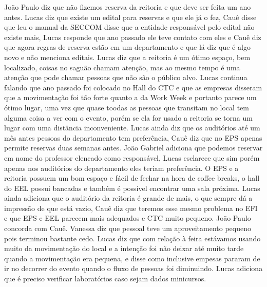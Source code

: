 \documentclass{ata-calico}
\begin{document}
 João Paulo diz que não fizemos reserva da
reitoria e que deve ser feita um ano antes. Lucas diz que existe um edital para
reservas e que ele já o fez, Cauê disse que leu o manual da SECCOM disse que a
entidade responsável pelo edital não existe mais, Lucas responde que ano
passado ele teve contato com eles e Cauê diz que agora regras de reserva estão
em um departamento e que lá diz que é algo novo e não menciona editais. Lucas
diz que a reitoria é um ótimo espaço, bem localizado, coisas no saguão chamam
atenção, mas ao mesmo tempo é uma atenção que pode chamar pessoas que não são o
público alvo. Lucas continua falando que ano passado foi colocado no Hall do
CTC e que as empresas disseram que a movimentação foi tão forte quanto a da
Work Week e portanto parece um ótimo lugar, uma vez que quase toodas as pessoas
que transitam no local tem alguma coisa a ver com o evento, porém se ela for
usado a reitoria se torna um lugar com uma distância inconveniente. Lucas ainda
diz que os auditórios até um mês antes pessoas do departamento tem preferência,
Cauê diz que no EPS apenas permite reservas duas semanas antes. João Gabriel
adiciona que podemos reservar em nome do professor elencado como responsável,
Lucas esclarece que sim porém apenas nos auditórios do departamento eles teriam
preferência. O EPS e a reitoria possuem um bom espaço e fácil de fechar na hora
de coffee breaks, o hall do EEL possui bancadas e também é possível encontrar
uma sala próxima.  Lucas ainda adiciona que o auditório da reitoria é grande de
mais, o que sempre dá a impressão de que está vazio, Cauê diz que teremos esse
mesmo problema no EFI e que EPS e EEL parecem mais adequados e CTC muito
pequeno. João Paulo concorda com Cauê. Vanessa diz que pessoal teve um
aproveitamento pequeno pois terminou bastante cedo. Lucas diz que com relação à
feira estávamos usando muito da movimentação do local e a intenção foi não
deixar até muito tarde quando a movimentação era pequena, e disse como
inclusive empesas pararam de ir no decorrer do evento quando o fluxo de pessoas
foi diminuindo. Lucas adiciona que é preciso verificar laboratórios caso sejam
dados minicursos.
\end{document}
